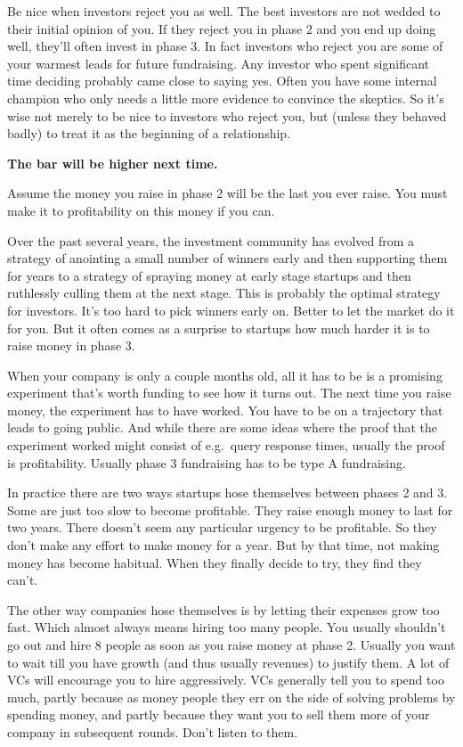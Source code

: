 Be nice when investors reject you as well. The best investors are not
wedded to their initial opinion of you. If they reject you in phase 2
and you end up doing well, they'll often invest in phase 3. In fact
investors who reject you are some of your warmest leads for future
fundraising. Any investor who spent significant time deciding probably
came close to saying yes. Often you have some internal champion who only
needs a little more evidence to convince the skeptics. So it's wise not
merely to be nice to investors who reject you, but (unless they behaved
badly) to treat it as the beginning of a relationship.

\textbf{The bar will be higher next time.}

Assume the money you raise in phase 2 will be the last you ever raise.
You must make it to profitability on this money if you can.

Over the past several years, the investment community has evolved from a
strategy of anointing a small number of winners early and then
supporting them for years to a strategy of spraying money at early stage
startups and then ruthlessly culling them at the next stage. This is
probably the optimal strategy for investors. It's too hard to pick
winners early on. Better to let the market do it for you. But it often
comes as a surprise to startups how much harder it is to raise money in
phase 3.

When your company is only a couple months old, all it has to be is a
promising experiment that's worth funding to see how it turns out. The
next time you raise money, the experiment has to have worked. You have
to be on a trajectory that leads to going public. And while there are
some ideas where the proof that the experiment worked might consist of
e.g.~query response times, usually the proof is profitability. Usually
phase 3 fundraising has to be type A fundraising.

In practice there are two ways startups hose themselves between phases 2
and 3. Some are just too slow to become profitable. They raise enough
money to last for two years. There doesn't seem any particular urgency
to be profitable. So they don't make any effort to make money for a
year. But by that time, not making money has become habitual. When they
finally decide to try, they find they can't.

The other way companies hose themselves is by letting their expenses
grow too fast. Which almost always means hiring too many people. You
usually shouldn't go out and hire 8 people as soon as you raise money at
phase 2. Usually you want to wait till you have growth (and thus usually
revenues) to justify them. A lot of VCs will encourage you to hire
aggressively. VCs generally tell you to spend too much, partly because
as money people they err on the side of solving problems by spending
money, and partly because they want you to sell them more of your
company in subsequent rounds. Don't listen to them.

